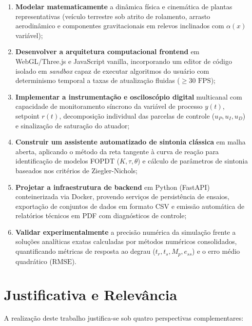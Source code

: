 \begin{enumerate}
    \item \textbf{Modelar matematicamente} a dinâmica física e cinemática de plantas representativas (veículo terrestre sob atrito de rolamento, arrasto aerodinâmico e componentes gravitacionais em relevos inclinados com $\alpha(x)$ variável);
    \item \textbf{Desenvolver a arquitetura computacional frontend} em WebGL/Three.js e JavaScript vanilla, incorporando um editor de código isolado em \textit{sandbox} capaz de executar algoritmos do usuário com determinismo temporal a taxas de atualização fluidas ($\ge 30\text{ FPS}$);
    \item \textbf{Implementar a instrumentação e osciloscópio digital} multicanal com capacidade de monitoramento síncrono da variável de processo $y(t)$, setpoint $r(t)$, decomposição individual das parcelas de controle ($u_P, u_I, u_D$) e sinalização de saturação do atuador;
    \item \textbf{Construir um assistente automatizado de sintonia clássica} em malha aberta, aplicando o método da reta tangente à curva de reação para identificação de modelos FOPDT ($K, \tau, \theta$) e cálculo de parâmetros de sintonia baseados nos critérios de Ziegler-Nichols;
    \item \textbf{Projetar a infraestrutura de backend} em Python (FastAPI) conteinerizada via Docker, provendo serviços de persistência de ensaios, exportação de conjuntos de dados em formato CSV e emissão automática de relatórios técnicos em PDF com diagnósticos de controle;
    \item \textbf{Validar experimentalmente} a precisão numérica da simulação frente a soluções analíticas exatas calculadas por métodos numéricos consolidados, quantificando métricas de resposta ao degrau ($t_r, t_s, M_p, e_{ss}$) e o erro médio quadrático ($\text{RMSE}$).
\end{enumerate}

\section{Justificativa e Relevância}
\label{sec:justificativa}

A realização deste trabalho justifica-se sob quatro perspectivas complementares:

